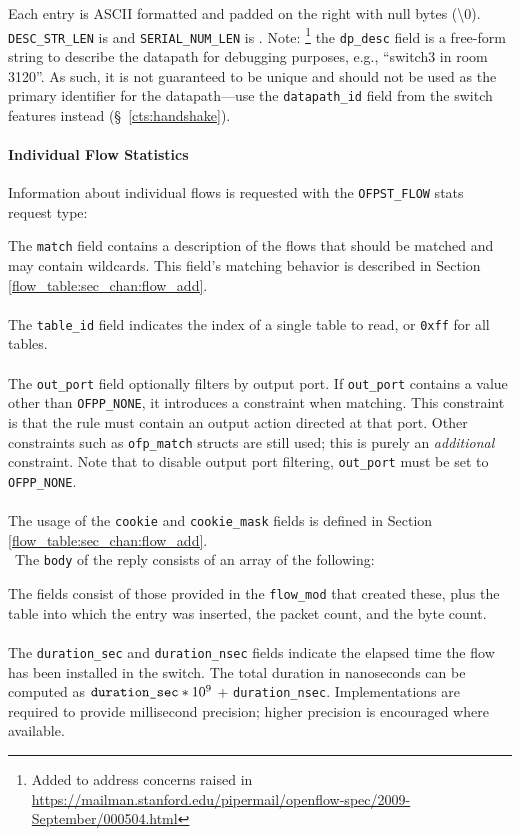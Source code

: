 
Each entry is ASCII formatted and padded on the right with null bytes (\textbackslash0).  \verb|DESC_STR_LEN| is and \verb|SERIAL_NUM_LEN| is .  Note: \footnote{Added to address concerns raised in \url{https://mailman.stanford.edu/pipermail/openflow-spec/2009-September/000504.html}} the \verb|dp_desc| field is a free-form string to describe the datapath for debugging purposes, e.g., ``switch3 in room 3120''.  As such, it is not guaranteed to be unique and should not be used as the primary identifier for the datapath---use the \verb|datapath_id| field from the switch features instead (\S~\ref{cts:handshake}).

\paragraph{Individual Flow Statistics}
Information about individual flows is requested with the \verb|OFPST_FLOW| stats request type:


The \verb|match| field contains a description of the flows that should be matched and may contain wildcards.  This field's matching behavior is described in Section \ref{flow_table:sec_chan:flow_add}.
\\\\
The \verb|table_id| field indicates the index of a single table to read, or \verb|0xff| for all tables.
\\\\
The \verb|out_port| field optionally filters by output port.  If \verb|out_port| contains a value other than \verb|OFPP_NONE|, it introduces a constraint when matching.  This constraint is that the rule must contain an output action directed at that port.  Other constraints such as \verb|ofp_match| structs are still used; this is purely an \emph{additional} constraint.  Note that to disable output port filtering, \verb|out_port| must be set to \verb|OFPP_NONE|. 
\\\\
The usage of the \verb|cookie| and \verb|cookie_mask| fields is defined in Section \ref{flow_table:sec_chan:flow_add}.
\\\
The \verb|body| of the reply consists of an array of the following:


The fields consist of those provided in the \verb|flow_mod| that created these, plus the table into which the entry was inserted, the packet count, and the byte count.
\\\\
\label{flow_duration_info}The \verb|duration_sec| and \verb|duration_nsec| fields indicate the elapsed time the flow has been installed in the switch. The total duration in nanoseconds can be computed as $\verb|duration_sec|*10^{9}$ + \verb|duration_nsec|. Implementations are required to provide millisecond precision; higher precision is encouraged where available.

